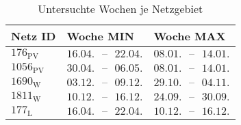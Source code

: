 {
\renewcommand{\arraystretch}{1.2}%
\begin{table}[H]
	\begin{center}
		\caption{Untersuchte Wochen je Netzgebiet}
		\begin{tabu} to 0.6\textwidth {X[0.5] X[1, r] X[1, r]}
			\toprule
			Netz ID	   & Woche MIN                         & Woche MAX                         \\ \midrule
			\(176_{\text{PV}}\)  & \(16.04. \text{ {--} } 22.04.\) & \(08.01. \text{ {--} } 14.01.\) \\
			\(1056_{\text{PV}}\) & \(30.04. \text{ {--} } 06.05.\) & \(08.01. \text{ {--} } 14.01.\) \\
			\(1690_{\text{W}}\) & \(03.12. \text{ {--} } 09.12.\) & \(29.10. \text{ {--} } 04.11.\) \\
			\(1811_{\text{W}}\) & \(10.12. \text{ {--} } 16.12.\) & \(24.09. \text{ {--} } 30.09.\) \\
			\(177_{\text{L}}\)  & \(16.04. \text{ {--} } 22.04.\) & \(10.12. \text{ {--} } 16.12.\) \\ \bottomrule
		\end{tabu}
		\label{tab:extreme_weeks}
	\end{center}
	\vspace{-3mm}%
\end{table}
}